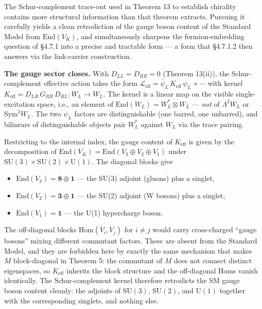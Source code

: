 \documentclass[
]{article}
\providecommand{\tightlist}{%
  \setlength{\itemsep}{0pt}\setlength{\parskip}{0pt}}
\begin{document}
The Schur-complement trace-out used in Theorem 13 to establish chirality
contains more structural information than that theorem extracts.
Pursuing it carefully yields a clean retrodiction of the gauge boson
content of the Standard Model from \(\mathrm{End}(V_K)\), and
simultaneously sharpens the fermion-embedding question of §4.7.1 into a
precise and tractable form --- a form that §4.7.1.2 then answers via the
link-carrier construction.

\textbf{The gauge sector closes.} With \(D_{LL} = D_{RR} = 0\) (Theorem
13(ii)), the Schur-complement effective action takes the form
\(\mathcal{L}_{\text{eff}} = \bar\psi_L\,K_{\text{eff}}\,\psi_L + \cdots\)
with kernel \(K_{\text{eff}} = D_{LR}\,G_{RR}\,D_{RL}: W_L \to W_L\).
The kernel is a linear map on the visible single-excitation space, i.e.,
an element of \(\mathrm{End}(W_L) = W_L^* \otimes W_L\) --- \emph{not}
of \(\Lambda^2 W_L\) or \(\mathrm{Sym}^2 W_L\). The two \(\psi_L\)
factors are distinguishable (one barred, one unbarred), and bilinears of
distinguishable objects pair \(W_L^*\) against \(W_L\) via the trace
pairing.

Restricting to the internal index, the gauge content of
\(K_{\text{eff}}\) is given by the decomposition of
\(\mathrm{End}(V_K) = \mathrm{End}(V_3 \oplus V_2 \oplus V_1)\) under
\(\mathrm{SU}(3) \times \mathrm{SU}(2) \times \mathrm{U}(1)\). The
diagonal blocks give

\begin{itemize}
\tightlist
\item
  \(\mathrm{End}(V_3) = \mathbf{8} \oplus \mathbf{1}\) --- the SU(3)
  adjoint (gluons) plus a singlet,
\item
  \(\mathrm{End}(V_2) = \mathbf{3} \oplus \mathbf{1}\) --- the SU(2)
  adjoint (W bosons) plus a singlet,
\item
  \(\mathrm{End}(V_1) = \mathbf{1}\) --- the U(1) hypercharge boson.
\end{itemize}

The off-diagonal blocks \(\mathrm{Hom}(V_i, V_j)\) for \(i \neq j\)
would carry cross-charged ``gauge bosons'' mixing different commutant
factors. These are absent from the Standard Model, and they are
forbidden here by exactly the same mechanism that makes \(M\)
block-diagonal in Theorem 5: the commutant of \(M\) does not connect
distinct eigenspaces, so \(K_{\text{eff}}\) inherits the block structure
and the off-diagonal Homs vanish identically. The Schur-complement
kernel therefore retrodicts the SM gauge boson content cleanly: the
adjoints of \(\mathrm{SU}(3)\), \(\mathrm{SU}(2)\), and
\(\mathrm{U}(1)\) together with the corresponding singlets, and nothing
else.
\end{document}

